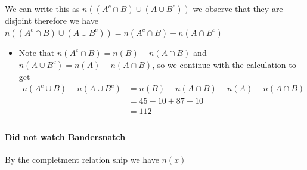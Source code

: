 \documentclass[11pt]{book}
\begin{document}
We can write this as $n\left(\left( A^{c} \cap B \right) \cup \left( A\cup B^{c}  \right) \right) $ we observe that they are disjoint therefore we have $n\left(\left( A^{c} \cap B \right) \cup \left( A\cup B^{c}  \right) \right) = n\left(A^{c} \cap B\right)  + n\left(A \cap B^{c} \right) $ 
\begin{itemize}
    \item Note that $n\left(A^{c} \cap B\right) = n\left(B\right)  - n\left(A\cap B\right) $ and $n\left(A\cup B^{c} \right) = n\left(A\right)  - n\left(A\cap B\right) $, so we continue with the calculation to get
        \begin{align*}
            n\left(A^{c} \cup B\right)  + n\left(A\cup B^{c} \right) &= n\left(B\right)  - n\left(A\cap B\right)  + n\left(A\right)  - n\left(A\cap B\right)   \\ 
            &= 45  - 10  + 87  - 10  \\ 
            &= 112  \\ 
        \end{align*}
\end{itemize}

\paragraph{Did not watch Bandersnatch} 
By the completment relation ship we have $n\left(x\right) $ 




\end{document}
